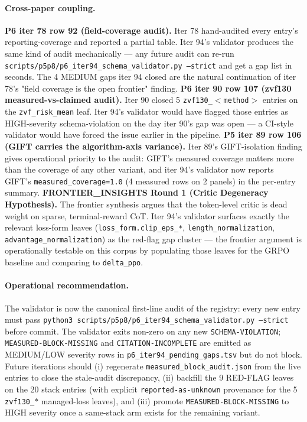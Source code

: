 \documentclass{article}
\begin{document}
\paragraph{Cross-paper coupling.}
\textbf{P6 iter 78 row 92 (field-coverage audit).} Iter 78 hand-audited every
entry's reporting-coverage and reported a partial table. Iter 94's validator
produces the same kind of audit mechanically --- any future audit can re-run
\texttt{scripts/p5p8/p6\_iter94\_schema\_validator.py --strict} and get a
gap list in seconds. The 4 MEDIUM gaps iter 94 closed are the natural
continuation of iter 78's "field coverage is the open frontier" finding.
\textbf{P6 iter 90 row 107 (zvf130 measured-vs-claimed audit).} Iter 90 closed
5 \texttt{zvf130\_$<$method$>$} entries on the \texttt{zvf\_risk\_mean} leaf.
Iter 94's validator would have flagged those entries as HIGH-severity
schema-violation on the day iter 90's gap was open --- a CI-style validator
would have forced the issue earlier in the pipeline. \textbf{P5 iter 89 row 106
(GIFT carries the algorithm-axis variance).} Iter 89's GIFT-isolation finding
gives operational priority to the audit: GIFT's measured coverage matters more
than the coverage of any other variant, and iter 94's validator now reports
GIFT's \texttt{measured\_coverage=1.0} (4 measured rows on 2 panels) in the
per-entry summary. \textbf{FRONTIER\_INSIGHTS Round 1 (Critic Degeneracy
Hypothesis).} The frontier synthesis argues that the token-level critic is
dead weight on sparse, terminal-reward CoT. Iter 94's validator surfaces
exactly the relevant loss-form leaves (\texttt{loss\_form.clip\_eps\_*},
\texttt{length\_normalization}, \texttt{advantage\_normalization}) as the
red-flag gap cluster --- the frontier argument is operationally testable on
this corpus by populating those leaves for the GRPO baseline and comparing
to \texttt{delta\_ppo}.

\paragraph{Operational recommendation.}
The validator is now the canonical first-line audit of the registry: every
new entry must pass \texttt{python3 scripts/p5p8/p6\_iter94\_schema\_validator.py
--strict} before commit. The validator exits non-zero on any new
\texttt{SCHEMA-VIOLATION}; \texttt{MEASURED-BLOCK-MISSING} and
\texttt{CITATION-INCOMPLETE} are emitted as MEDIUM/LOW severity rows in
\texttt{p6\_iter94\_pending\_gaps.tsv} but do not block. Future iterations
should (i) regenerate \texttt{measured\_block\_audit.json} from the live
entries to close the stale-audit discrepancy, (ii) backfill the 9 RED-FLAG
leaves on the 20 stack entries (with explicit
\texttt{reported-as-unknown} provenance for the 5 \texttt{zvf130\_$*$}
managed-loss leaves), and (iii) promote \texttt{MEASURED-BLOCK-MISSING} to
HIGH severity once a same-stack arm exists for the remaining variant.
\end{document}
